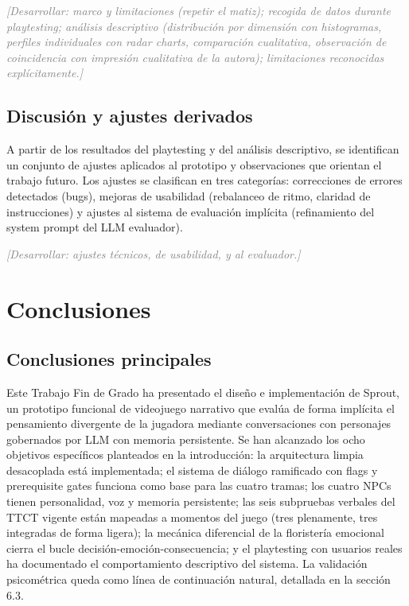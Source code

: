 \documentclass[12pt,twoside,titlepage]{report}
\begin{document}
\textcolor{gray}{\textit{[Desarrollar: marco y limitaciones (repetir el matiz); recogida de datos durante playtesting; análisis descriptivo (distribución por dimensión con histogramas, perfiles individuales con radar charts, comparación cualitativa, observación de coincidencia con impresión cualitativa de la autora); limitaciones reconocidas explícitamente.]}}

\section{Discusión y ajustes derivados}

A partir de los resultados del playtesting y del análisis descriptivo, se identifican un conjunto de ajustes aplicados al prototipo y observaciones que orientan el trabajo futuro. Los ajustes se clasifican en tres categorías: correcciones de errores detectados (bugs), mejoras de usabilidad (rebalanceo de ritmo, claridad de instrucciones) y ajustes al sistema de evaluación implícita (refinamiento del system prompt del LLM evaluador).

\textcolor{gray}{\textit{[Desarrollar: ajustes técnicos, de usabilidad, y al evaluador.]}}

\chapter{Conclusiones}

\section{Conclusiones principales}

Este Trabajo Fin de Grado ha presentado el diseño e implementación de Sprout, un prototipo funcional de videojuego narrativo que evalúa de forma implícita el pensamiento divergente de la jugadora mediante conversaciones con personajes gobernados por LLM con memoria persistente. Se han alcanzado los ocho objetivos específicos planteados en la introducción: la arquitectura limpia desacoplada está implementada; el sistema de diálogo ramificado con flags y prerequisite gates funciona como base para las cuatro tramas; los cuatro NPCs tienen personalidad, voz y memoria persistente; las seis subpruebas verbales del TTCT vigente están mapeadas a momentos del juego (tres plenamente, tres integradas de forma ligera); la mecánica diferencial de la floristería emocional cierra el bucle decisión-emoción-consecuencia; y el playtesting con usuarios reales ha documentado el comportamiento descriptivo del sistema. La validación psicométrica queda como línea de continuación natural, detallada en la sección 6.3.
\end{document}
